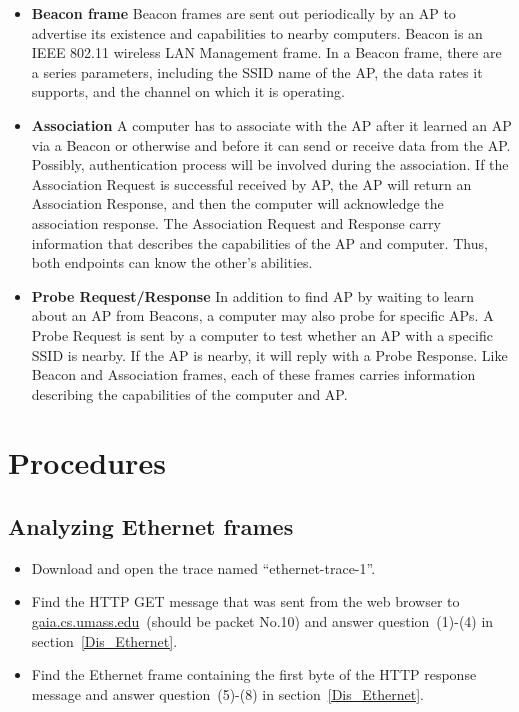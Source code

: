 \begin{itemize}
\item \textbf{Beacon frame} Beacon frames are sent out periodically by an AP to advertise its existence and capabilities to nearby computers. Beacon is an IEEE 802.11 wireless LAN Management frame. In a Beacon frame, there are a series parameters, including the SSID name of the AP, the data rates it supports, and the channel on which it is operating. 

\item \textbf{Association} A computer has to associate with the AP after it learned an AP via a Beacon or otherwise and before it can send or receive data from the AP. Possibly, authentication process will be involved during the association. If the Association Request is successful received by AP, the AP will return an Association Response, and then the computer will acknowledge the association response. The Association Request and Response carry information that describes the capabilities of the AP and computer. Thus, both endpoints can know the other's abilities.

\item \textbf{Probe Request/Response} In addition to find AP by waiting to learn about an AP from Beacons, a computer may also probe for specific APs. A Probe Request is sent by a computer to test whether an AP with a specific SSID is nearby. If the AP is nearby, it will reply with a Probe Response. Like Beacon and Association frames, each of these frames carries information describing the capabilities of the computer and AP. 
\end{itemize}

\section{Procedures}
\subsection{Analyzing Ethernet frames}\label{Pro_Ethernet}
\begin{itemize}
\item Download and open the trace named ``ethernet-trace-1''.


\item Find the HTTP GET message that was sent from the web browser to \url{gaia.cs.umass.edu}~(should be packet No.10) and answer question~(1)-(4) in section~\ref{Dis_Ethernet}.

\item Find the Ethernet frame containing the first byte of the HTTP response message and answer question~(5)-(8) in section~\ref{Dis_Ethernet}.
\end{itemize}

